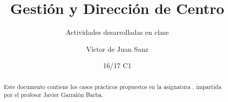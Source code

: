 \documentclass[palatino,nochap,nobuilddate,subset]{apuntesURJC}
\title{Gestión y Dirección de Centro}
\subtitle{Actividades desarrolladas en clase}
\author{Víctor de Juan Sanz}
\date{16/17 C1}
\begin{document}
\pagestyle{plain}

\begin{abstract}
Este documento contiene los casos prácticos propuestos en la asignatura \thetitle, impartida por el profesor Javier Garralón Barba.
\end{abstract}

\maketitle

\tableofcontents
\newpage





\end{document}
